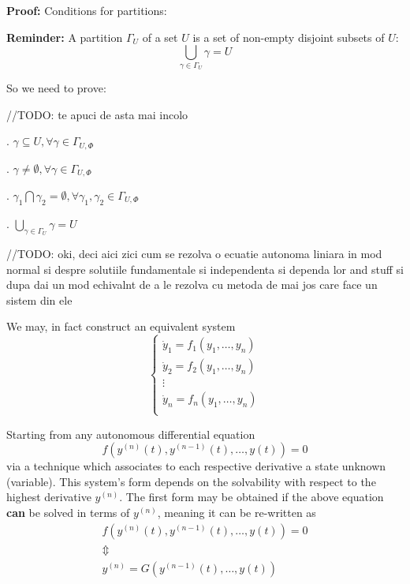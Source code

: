 \textbf{Proof:}
Conditions for partitions:
\par \textbf{Reminder:} A partition $\Gamma_U$ of a set $U$ is a set of non-empty disjoint subsets of $U$:
\[
				\bigcup_{\gamma\in \Gamma_U} \gamma = U
\]

So we need to prove:

\hfill\break
//TODO: te apuci de asta mai incolo \par
\hfill\break

. $\gamma \subseteq U, \forall \gamma \in \Gamma_{U,\Phi}$ \par
{}. $ \gamma \neq \emptyset, \forall \gamma \in \Gamma_{U,\Phi}$ \par
{}. $\gamma_1 \bigcap \gamma_2 = \emptyset, \forall \gamma_1, \gamma_2 \in \Gamma_{U,\Phi}$ \par
{}. $\bigcup_{\gamma\in \Gamma_U} \gamma = U$ \par

\hfill\break
//TODO: oki, deci aici zici cum se rezolva o ecuatie autonoma liniara in mod normal si despre solutiile fundamentale si independenta si dependa lor and stuff si dupa dai un mod echivalnt de a le rezolva cu metoda de mai jos care face un sistem din ele
\hfill\break

We may, in fact construct an equivalent system
\[
				\begin{cases}
								\dot{y}_1 = f_1(y_1,\dots, y_n) \\
								\dot{y}_2 = f_2(y_1,\dots, y_n) \\
								\vdots                          \\
								\dot{y}_n = f_n(y_1,\dots, y_n) \\
				\end{cases}
\]

Starting from any autonomous differential equation
\[
				f(y^{(n)}(t), y^{(n-1)}(t), \dots, y(t))= 0
\]
via a technique which associates to each respective derivative a state unknown (variable).
This system's form depends on the solvability with respect to the highest derivative $y^{(n)}$.
The first form may be obtained if the above equation \textbf{can} be solved in terms of $y^{(n)}$, meaning it can be re-written as
\begin{gather*}
				f(y^{(n)}(t), y^{(n-1)}(t), \dots, y(t))= 0 \\
				\Updownarrow \\
				y^{(n)}  = G(y^{(n-1)}(t), \dots, y(t))
\end{gather*}


